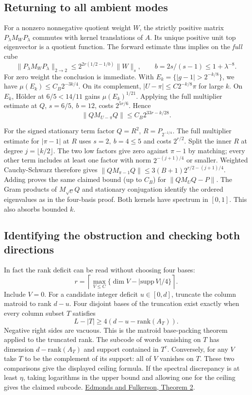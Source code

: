 \documentclass[11pt]{article}
\begin{document}
\subsection{Returning to all ambient modes}

For a nonzero nonnegative quotient weight \(W\), the strictly positive matrix \(P_\lambda M_W P_\lambda\) commutes with kernel translations of \(A\). Its unique positive unit top eigenvector is a quotient function. The forward estimate thus implies on the \emph{full} cube
\[
 \|P_\lambda M_W P_\lambda\|_{2\to2}\le
 2^{2r(1/2-1/b)}\|W\|_s,\qquad b=2s/(s-1)\le1+\lambda^{-8}.
\]
For zero weight the conclusion is immediate. With \(E_k=\{|g-1|>2^{-k/8}\}\), we have \(\mu(E_k)\le C_B2^{-3k/4}\). On its complement, \(|U-\pi|\le C2^{-k/8}\pi\) for large \(k\). On \(E_k\), Hölder at \(6/5<14/11\) gains \(\mu(E_k)^{1/21}\). Applying the full multiplier estimate at \(Q\), \(s=6/5,\ b=12\), costs \(2^{5r/6}\). Hence
\[
 \|QM_{U-\pi}Q\|\le C_B 2^{33r-k/28}.
\]

For the signed stationary term factor \(Q=R^2\), \(R=P_{2^{-1/4}}\). The full multiplier estimate for \(|\pi-1|\) at \(R\) uses \(s=2,\ b=4\le5\) and costs \(2^{r/2}\). Split the inner \(R\) at degree \(j=\lfloor k/2\rfloor\). The two low factors give zero against \(\pi-1\) by matching; every other term includes at least one factor with norm \(2^{-(j+1)/4}\) or smaller. Weighted Cauchy-Schwarz therefore gives \(\|QM_{\pi-1}Q\|\le 3(B+1)2^{r/2-(j+1)/4}\). Adding proves the same claimed bound (up to \(C_B\)) for \(\|QM_UQ-P\|\). The Gram products of \(M_{\sqrt U}Q\) and stationary conjugation identify the ordered eigenvalues as in the four-basis proof. Both kernels have spectrum in \([0,1]\). This also absorbs bounded \(k\).

\subsection{Identifying the obstruction and checking both directions}

In fact the rank deficit can be read without choosing four bases:
\[
 r=\left\lceil\max_{V\le C}\{\dim V-|\mathrm{supp}\,V|/4\}\right\rceil .
\]
Include \(V=0\). For a candidate integer deficit \(u\in[0,d]\), truncate the column matroid to rank \(d-u\). Four disjoint bases of the truncation exist exactly when every column subset \(T\) satisfies
\[
 L-|T|\ge4(d-u-\mathrm{rank}(A_T)).
\]
Negative right sides are vacuous. This is the matroid base-packing theorem applied to the truncated rank. The subcode of words vanishing on \(T\) has dimension \(d-\mathrm{rank}(A_T)\) and support contained in \(T^c\). Conversely, for any \(V\) take \(T\) to be the complement of its support: all of \(V\) vanishes on \(T\). These two comparisons give the displayed ceiling formula. If the spectral discrepancy is at least \(\eta\), taking logarithms in the upper bound and allowing one for the ceiling gives the claimed subcode. \href{https://nvlpubs.nist.gov/nistpubs/jres/69B/jresv69Bn3p147_A1b.pdf}{Edmonds and Fulkerson, Theorem 2}.
\end{document}
